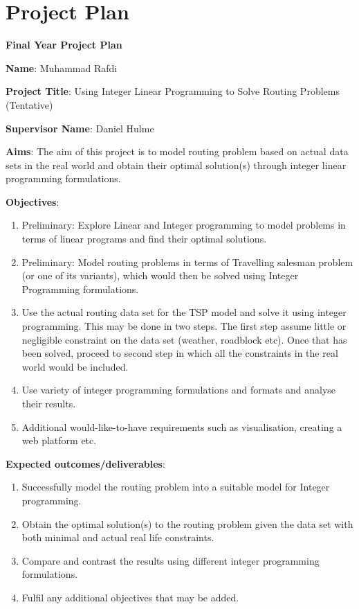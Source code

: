 \section{Project Plan}
\textbf{Final Year Project Plan}

\textbf{Name}: Muhammad Rafdi

\textbf{Project Title}: Using Integer Linear Programming to Solve Routing Problems (Tentative)

\textbf{Supervisor Name}: Daniel Hulme

\textbf{Aims}: The aim of this project is to model routing problem based on actual data sets in the real world and obtain their optimal solution(s) through integer linear programming formulations.

\textbf{Objectives}:
\begin{enumerate}
    \item Preliminary: Explore Linear and Integer programming to model problems in terms of linear programs and find their optimal solutions.
    \item Preliminary: Model routing problems in terms of Travelling salesman problem (or one of its variants), which would then be solved using Integer Programming formulations.
    \item Use the actual routing data set for the TSP model and solve it using integer programming. This may be done in two steps. The first step assume little or negligible constraint on the data set (weather, roadblock etc). Once that has been solved, proceed to second step in which all the constraints in the real world would be included.
    \item Use variety of integer programming formulations and formats and analyse their results.
    \item Additional would-like-to-have requirements such as visualisation, creating a web platform etc.
\end{enumerate}

\textbf{Expected outcomes/deliverables}:
\begin{enumerate}
    \item Successfully model the routing problem into a suitable model for Integer programming.
    \item Obtain the optimal solution(s) to the routing problem given the data set with both minimal and actual real life constraints.
    \item Compare and contrast the results using different integer programming formulations.
    \item Fulfil any additional objectives that may be added.
\end{enumerate}

